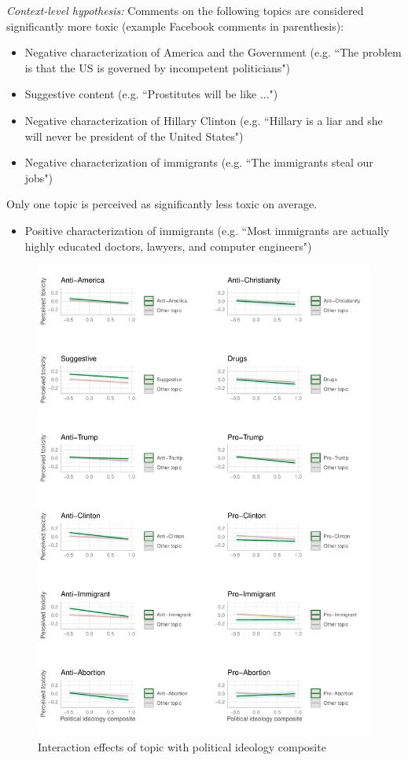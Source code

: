 \documentclass{article}
\begin{document}
\textit{Context-level hypothesis:} Comments on the following topics are considered significantly more toxic (example Facebook comments in parenthesis): 
\begin{itemize}
    \item Negative characterization of America and the Government (e.g. ``The problem is that the US is governed by incompetent politicians")
    \item Suggestive content (e.g. ``Prostitutes will be like ...")
    \item Negative characterization of Hillary Clinton (e.g. ``Hillary is a liar and she will never be president of the United States")
    \item Negative characterization of immigrants (e.g. ``The immigrants steal our jobs")
\end{itemize}

Only one topic is perceived as significantly less toxic on average.

\begin{itemize}
    \item Positive characterization of immigrants (e.g. ``Most immigrants are actually highly educated doctors, lawyers, and computer engineers")
\end{itemize}

\begin{figure}
    \centering
    \includegraphics[width=1.1\linewidth]{figures/topic_interactions.pdf}
    \caption{Interaction effects of topic with political ideology composite}
    \label{fig:topic-polid-interaction}
\end{figure}
\end{document}
